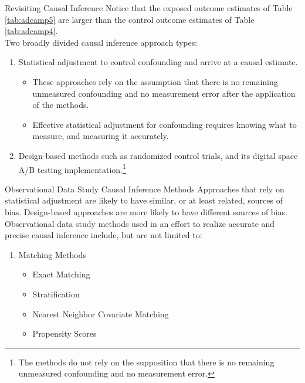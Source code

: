 \documentclass[pdf]{beamer}
\theoremstyle{remark}
\theoremstyle{definition}
\begin{document}
\begin{frame}[t]{Revisiting Causal Inference}
Notice that the exposed outcome estimates of Table \ref{tab:adcamp5} are larger than the control outcome estimates of Table \ref{tab:adcamp4}. \\
\vspace{1.5ex}
Two broadly divided causal inference approach types: 
\begin{enumerate}
\item Statistical adjustment to control confounding and arrive at a causal estimate.  
\begin{itemize}
\item These approaches rely on the assumption that there is no remaining unmeasured confounding and no measurement error after the application of the methods. 
\item Effective statistical adjustment for confounding requires knowing what to measure, and measuring it accurately.
\end{itemize}
\item Design-based methods such as randomized control trials, and its digital space A/B testing implementation.\footnote{The methods do not rely on the supposition that there is no remaining unmeasured confounding and no measurement error. } 
\end{enumerate}
\end{frame}

\begin{frame}[t]{Observational Data Study Causal Inference Methods}
Approaches that rely on statistical adjustment are likely to have similar, or at least related, sources of bias. Design-based approaches are more likely to have different sources of bias. \\
\vspace{1.5ex}
Observational data study methods used in an effort to realize accurate and precise causal inference include, but are not limited to: \\
\vspace{1.5ex}
\begin{enumerate}
\item Matching Methods
\begin{itemize}
\item Exact Matching
\item Stratification
\item Nearest Neighbor Covariate Matching
\item Propensity Scores
\end{itemize}
\end{enumerate}
\end{frame}
\end{document}
